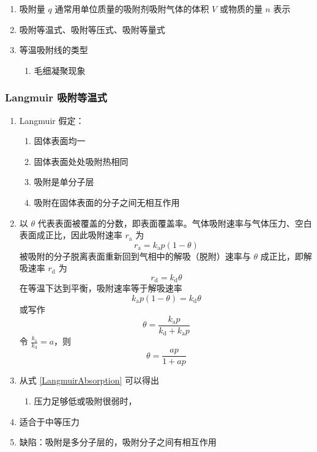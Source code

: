 \begin{enumerate}
    \item 吸附量 $q$ 通常用单位质量的吸附剂吸附气体的体积 $V$ 或物质的量 $n$ 表示
    \item 吸附等温式、吸附等压式、吸附等量式
    \item 等温吸附线的类型
    \begin{enumerate}
        \item 毛细凝聚现象
    \end{enumerate}
\end{enumerate}

\subsubsection{Langmuir 吸附等温式}

\begin{enumerate}
    \item Langmuir 假定：
    \begin{enumerate}
        \item 固体表面均一
        \item 固体表面处处吸附热相同
        \item 吸附是单分子层
        \item 吸附在固体表面的分子之间无相互作用
    \end{enumerate}
    \item 以 $\theta$ 代表表面被覆盖的分数，即表面覆盖率。气体吸附速率与气体压力、空白表面成正比，因此吸附速率 $r_{\mathrm{a}}$ 为
    \begin{equation*}
        r_{\mathrm{a}} = k_{\mathrm{a}} p(1 - \theta)
    \end{equation*}
    被吸附的分子脱离表面重新回到气相中的解吸（脱附）速率与 $\theta$ 成正比，即解吸速率 $r_\mathrm{d}$ 为
    \begin{equation*}
        r_{\mathrm{d}} = k_{\mathrm{d}} \theta
    \end{equation*}
    在等温下达到平衡，吸附速率等于解吸速率
    \begin{equation*}
        k_{\mathrm{a}} p(1 - \theta) = k_{\mathrm{d}} \theta
    \end{equation*}
    或写作
    \begin{equation*}
        \theta = \frac{k_{\mathrm{a}} p}{k_\mathrm{d} + k_{\mathrm{a}} p}
    \end{equation*}
    令 $\displaystyle \frac{k_{\mathrm{a}}}{k_{\mathrm{d}}} = a$，则
    \begin{equation}
        \theta = \frac{ap}{1+ap} \label{LangmuirAbsorption}
    \end{equation}
    \item 从式 \eqref{LangmuirAbsorption} 可以得出
    \begin{enumerate}
        \item 压力足够低或吸附很弱时，
    \end{enumerate}
    \item 适合于中等压力
    \item 缺陷：吸附是多分子层的，吸附分子之间有相互作用
\end{enumerate}

